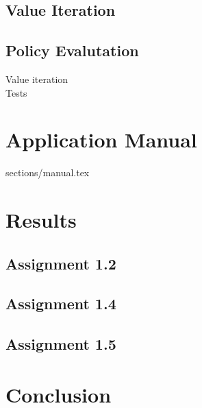 \documentclass{article}
\begin{document}
\subsection{Value Iteration}


\subsection{Policy Evalutation}


Value iteration\\
Tests\\

\section{Application Manual}
 {sections/manual.tex}

\section{Results}
\label{sec:results}

\subsection{Assignment 1.2}


\subsection{Assignment 1.4}


\subsection{Assignment 1.5}


\section{Conclusion}
\end{document}
